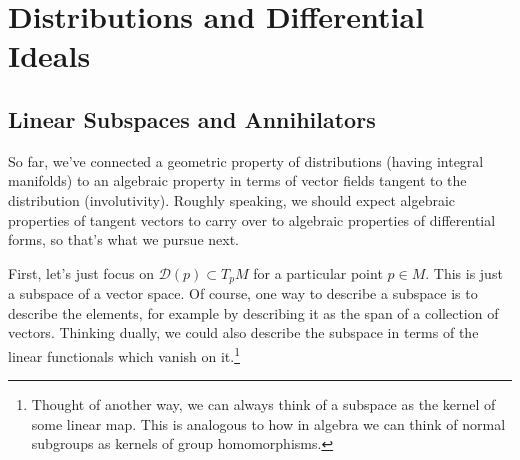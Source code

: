 
\section{Distributions and Differential Ideals}
\label{sec:distributions and differential ideals}

\subsection{Linear Subspaces and Annihilators} 
\label{sub:linear_subspaces_and_annihilators}


So far, we've connected a geometric property of distributions (having integral manifolds) to an algebraic property in terms of vector fields tangent to the distribution (involutivity). Roughly speaking, we should expect algebraic properties of tangent vectors to carry over to algebraic properties of differential forms, so that's what we pursue next.

First, let's just focus on $\mathcal{D}(p) \subset T_p M$ for a particular point $p \in M$. This is just a subspace of a vector space. Of course, one way to describe a subspace is to describe the elements, for example by describing it as the span of a collection of vectors. Thinking dually, we could also describe the subspace in terms of the linear functionals which vanish on it.\footnote{Thought of another way, we can always think of a subspace as the kernel of some linear map. This is analogous to how in algebra we can think of normal subgroups as kernels of group homomorphisms.}

